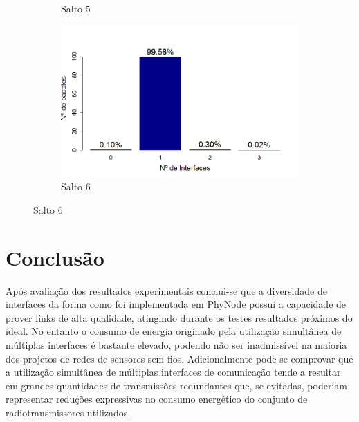 \documentclass[
	12pt,				%
	openright,			%
	oneside,
	a4paper,			%
	english,			%
	french,				%
	spanish,			%
	brazil				%
	]{abntex2}
\begin{document}
\begin{figure}[t!]
\begin{subfigure}{.5\textwidth}
		\captionsetup{width=.9\textwidth}
		\caption{Salto 5}
		\label{dpr_opt_s5}
	\end{subfigure}%
	\begin{subfigure}{.5\textwidth}
		\centering
		\includegraphics[width=.98\linewidth]{DRP_OPT_Salto6}
		\captionsetup{width=.9\textwidth}
		\caption{Salto 6}
		\label{dpr_opt_s6}
	\end{subfigure}
\end{figure}


\chapter{Conclusão} \label{chap_concl}

Após avaliação dos resultados experimentais conclui-se que a diversidade de interfaces da forma como foi implementada em PhyNode possui a capacidade de prover links de alta qualidade, atingindo durante os testes resultados próximos do ideal. No entanto o consumo de energia originado pela utilização simultânea de múltiplas interfaces é bastante elevado, podendo não ser inadmissível na maioria dos projetos de redes de sensores sem fios. Adicionalmente pode-se comprovar que a utilização simultânea de múltiplas interfaces de comunicação tende a resultar em grandes quantidades de transmissões redundantes que, se evitadas, poderiam representar reduções expressivas no consumo energético do conjunto de radiotransmissores utilizados. 
\end{document}
